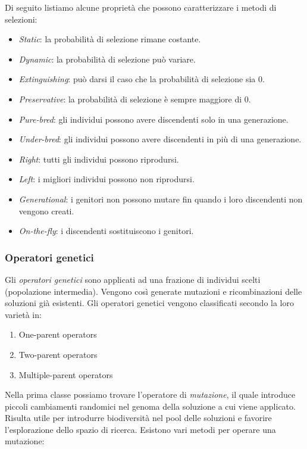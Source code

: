 \documentclass[10pt,a4paper]{article}
\begin{document}
Di seguito listiamo alcune proprietà che possono caratterizzare i metodi di selezioni:

\begin{itemize}
\item{\emph{Static}: la probabilità di selezione rimane costante.}
\item{\emph{Dynamic}: la probabilità di selezione può variare.}
\item{\emph{Extinguishing}: può darsi il caso che la probabilità di selezione sia 0.}
\item{\emph{Preservative}: la probabilità di selezione è sempre maggiore di 0.}
\item{\emph{Pure-bred}: gli individui possono avere discendenti solo in una generazione.}
\item{\emph{Under-bred}: gli individui possono avere discendenti in più di una generazione.}
\item{\emph{Right}: tutti gli individui possono riprodursi.}
\item{\emph{Left}: i migliori individui possono non riprodursi.}
\item{\emph{Generational}: i genitori non possono mutare fin quando i loro discendenti non vengono creati.}
\item{\emph{On-the-fly}: i discendenti sostituiscono i genitori.}
\end{itemize}


\subsubsection{Operatori genetici}

Gli \emph{operatori genetici} sono applicati ad una frazione di individui scelti (popolazione intermedia). Vengono così generate mutazioni e ricombinazioni delle soluzioni già esistenti. Gli operatori genetici vengono classificati secondo la loro varietà in:

\begin{enumerate}
\item{One-parent operators}
\item{Two-parent operators}
\item{Multiple-parent operators}
\end{enumerate}

Nella prima classe possiamo trovare l'operatore di \emph{mutazione}, il quale introduce piccoli cambiamenti randomici nel genoma della soluzione a cui viene applicato. Risulta utile per introdurre biodiversità nel pool delle soluzioni e favorire l'esplorazione dello spazio di ricerca. Esistono vari metodi per operare una mutazione:
\end{document}
